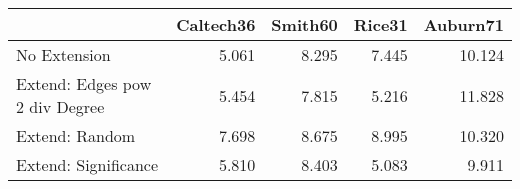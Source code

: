 \begin{tabular}{lrrrr}
\toprule
{} & Caltech36 & Smith60 & Rice31 & Auburn71 \\
\midrule
No Extension                   &     5.061 &   8.295 &  7.445 &   10.124 \\
Extend: Edges pow 2 div Degree &     5.454 &   7.815 &  5.216 &   11.828 \\
Extend: Random                 &     7.698 &   8.675 &  8.995 &   10.320 \\
Extend: Significance           &     5.810 &   8.403 &  5.083 &    9.911 \\
\bottomrule
\end{tabular}
